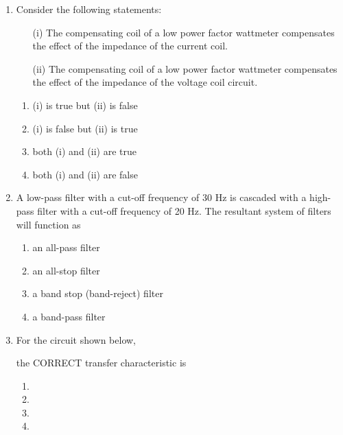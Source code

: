 \documentclass[journal,9pt,onecolumn]{IEEEtran}
\begin{document}
\begin{enumerate}
\item Consider the following statements:
\begin{itemize}
    \item[(i)] The compensating coil of a low power factor wattmeter compensates the effect of the impedance of the current coil.
    \item[(ii)] The compensating coil of a low power factor wattmeter compensates the effect of the impedance of the voltage coil circuit.
\end{itemize}

\begin{multicols}{2}
    \begin{enumerate}
        \item (i) is true but (ii) is false
        \item (i) is false but (ii) is true
        \item both (i) and (ii) are true
        \item both (i) and (ii) are false
    \end{enumerate}
\end{multicols}

\item A low-pass filter with a cut-off frequency of 30 Hz is cascaded with a high-pass filter with a cut-off frequency of 20 Hz. The resultant system of filters will function as
\begin{multicols}{2}
    \begin{enumerate}
        \item an all-pass filter
        \item an all-stop filter
        \item a band stop (band-reject) filter
        \item a band-pass filter
    \end{enumerate}
\end{multicols}

\item For the circuit shown below, 
\begin{center}
    
\end{center}
the CORRECT transfer characteristic is
\begin{multicols}{2}
    \begin{enumerate}
        \item 
        \item 
        \item 
        \item 
    \end{enumerate}
\end{multicols}


\end{enumerate}
\end{document}
